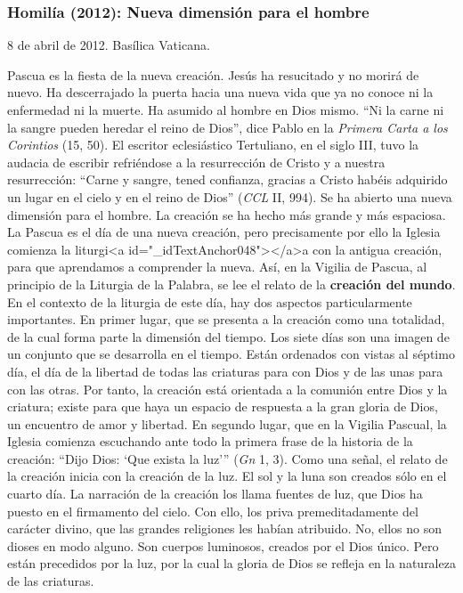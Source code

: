 			\subsubsection{Homilía (2012): Nueva dimensión para el hombre}
			
			\begin{referencia}8 de abril de 2012. Basílica Vaticana.\end{referencia}
			
			\begin{body}Pascua es la fiesta de la nueva creación. Jesús ha resucitado y no morirá de nuevo. Ha descerrajado la puerta hacia una nueva vida que ya no conoce ni la enfermedad ni la muerte. Ha asumido al hombre en Dios mismo. “Ni la carne ni la sangre pueden heredar el reino de Dios”, dice Pablo en la \textit{Primera Carta a los Corintios} (15, 50). El escritor eclesiástico Tertuliano, en el siglo III, tuvo la audacia de escribir refriéndose a la resurrección de Cristo y a nuestra resurrección: “Carne y sangre, tened confianza, gracias a Cristo habéis adquirido un lugar en el cielo y en el reino de Dios” (\textit{CCL} II, 994). Se ha abierto una nueva dimensión para el hombre. La creación se ha hecho más grande y más espaciosa. La Pascua es el día de una nueva creación, pero precisamente por ello la Iglesia comienza la liturgi<a id="_idTextAnchor048"></a>a con la antigua creación, para que aprendamos a comprender la nueva. Así, en la Vigilia de Pascua, al principio de la Liturgia de la Palabra, se lee el relato de la \textbf{creación del mundo}. En el contexto de la liturgia de este día, hay dos aspectos particularmente importantes. En primer lugar, que se presenta a la creación como una totalidad, de la cual forma parte la dimensión del tiempo. Los siete días son una imagen de un conjunto que se desarrolla en el tiempo. Están ordenados con vistas al séptimo día, el día de la libertad de todas las criaturas para con Dios y de las unas para con las otras. Por tanto, la creación está orientada a la comunión entre Dios y la criatura; existe para que haya un espacio de respuesta a la gran gloria de Dios, un encuentro de amor y libertad. En segundo lugar, que en la Vigilia Pascual, la Iglesia comienza escuchando ante todo la primera frase de la historia de la creación: “Dijo Dios: ‘Que exista la luz’” (\textit{Gn} 1, 3). Como una señal, el relato de la creación inicia con la creación de la luz. El sol y la luna son creados sólo en el cuarto día. La narración de la creación los llama fuentes de luz, que Dios ha puesto en el firmamento del cielo. Con ello, los priva premeditadamente del carácter divino, que las grandes religiones les habían atribuido. No, ellos no son dioses en modo alguno. Son cuerpos luminosos, creados por el Dios único. Pero están precedidos por la luz, por la cual la gloria de Dios se refleja en la naturaleza de las criaturas.\end{body}
			
